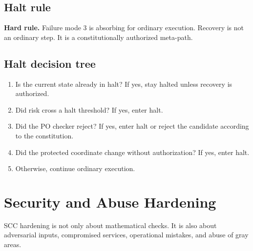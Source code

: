 \documentclass[11pt,oneside]{article}
\newenvironment{rulebox}{\begin{shaded}\noindent\textbf{Hard rule.} }{\end{shaded}}
\begin{document}
\subsection{Halt rule}
\begin{rulebox}
Failure mode 3 is absorbing for ordinary execution. Recovery is not an ordinary step. It is a constitutionally authorized meta-path.
\end{rulebox}

\subsection{Halt decision tree}
\begin{enumerate}
\item Is the current state already in halt? If yes, stay halted unless recovery is authorized.
\item Did risk cross a halt threshold? If yes, enter halt.
\item Did the PO checker reject? If yes, enter halt or reject the candidate according to the constitution.
\item Did the protected coordinate change without authorization? If yes, enter halt.
\item Otherwise, continue ordinary execution.
\end{enumerate}



\section{Security and Abuse Hardening}
SCC hardening is not only about mathematical checks. It is also about adversarial inputs, compromised services, operational mistakes, and abuse of gray areas.
\end{document}
